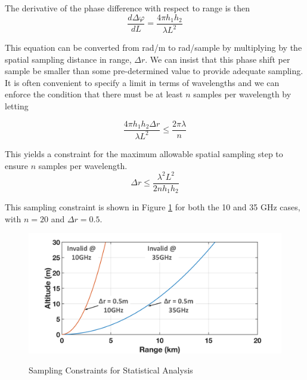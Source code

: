 \noindent The derivative of the phase difference with respect to range is then
\begin{equation}
\frac{d\Delta\varphi}{dL}=\frac{4\pi h_1h_2}{\lambda L^2}
\label{stat_eq:2}
\end{equation}
\renewcommand{\baselinestretch}{2} \small\normalsize

\noindent This equation can be converted from rad/m to rad/sample by multiplying by the spatial sampling distance in range, $\Delta r$. We can insist that this phase shift per sample be smaller than some pre-determined value to provide adequate sampling. It is often convenient to specify a limit in terms of wavelengths and we can enforce the condition that there must be at least $n$ samples per wavelength by letting

\begin{equation}
\frac{4\pi h_1h_2\Delta r}{\lambda L^2} \leq \frac{2\pi \lambda}{n}
\label{stat_eq:3}
\end{equation}

This yields a constraint for the maximum allowable spatial sampling step to ensure $n$ samples per wavelength.
\begin{equation}
\boxed{\Delta r \leq \frac{\lambda^2 L^2}{2nh_1h_2}}
\label{stat_eq:4}
\end{equation}

This sampling constraint is shown in Figure \ref{stat_fig:3} for both the 10 and 35 GHz cases, with $n = 20$ and $\Delta r = 0.5$.

\begin{figure}[H]
  \begin{center}
\includegraphics[width=5in]{../media/statistics/sampling_constraint.png}
  \end{center}
  \renewcommand{\baselinestretch}{1} \small\normalsize
  \begin{quote}
    \caption[Sampling Constraints for Statistical Analysis]{Sampling Constraints for Statistical Analysis\label{stat_fig:3}}
  \end{quote}
\end{figure}
\renewcommand{\baselinestretch}{2} \small\normalsize

